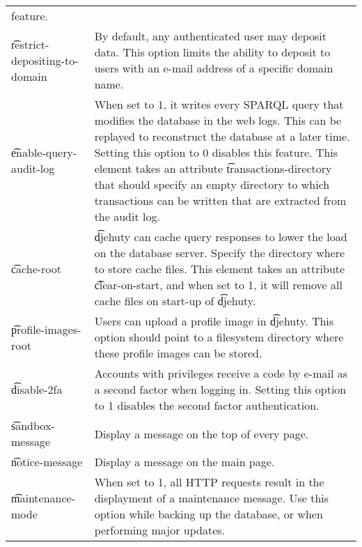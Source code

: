 \begin{tabular}{p{} p{}}
                               feature.\\
  \t{restrict-depositing-to-domain} & By default, any authenticated user may
                               deposit data.  This option limits the ability
                               to deposit to users with an e-mail address of
                               a specific domain name.\\
  \t{enable-query-audit-log} & When set to 1, it writes every SPARQL query that
                               modifies the database in the web logs.  This can
                               be replayed to reconstruct the database at a
                               later time.  Setting this option to 0 disables
                               this feature.  This element takes an attribute
                               \t{transactions-directory} that should specify
                               an empty directory to which transactions can be
                               written that are extracted from the audit log.\\
  \t{cache-root}             & \t{djehuty} can cache query responses to lower
                               the load on the database server.  Specify the
                               directory where to store cache files.  This
                               element takes an attribute \t{clear-on-start},
                               and when set to 1, it will remove all cache files
                               on start-up of \t{djehuty}.\\
  \t{profile-images-root}    & Users can upload a profile image in \t{djehuty}.
                               This option should point to a filesystem directory
                               where these profile images can be stored.\\
  \t{disable-2fa}            & Accounts with privileges receive a code by e-mail
                               as a second factor when logging in.  Setting this
                               option to 1 disables the second factor
                               authentication.\\
  \t{sandbox-message}        & Display a message on the top of every page.\\
  \t{notice-message}         & Display a message on the main page.\\
  \t{maintenance-mode}       & When set to 1, all HTTP requests result in the
                               displayment of a maintenance message. Use this
                               option while backing up the database, or when
                               performing major updates.\\
\end{tabular}

